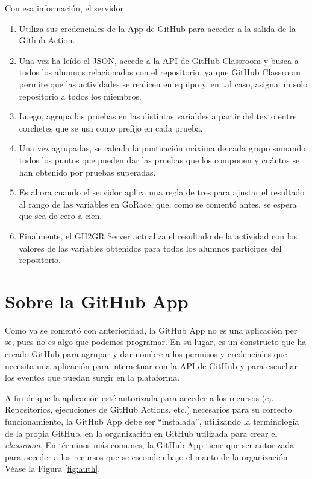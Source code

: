 Con esa información, el servidor 
\begin{enumerate}
\item Utiliza sus credenciales de la App de GitHub para acceder a la salida de la Github Action. 
\item Una vez ha leído el \acrshort{JSON}, accede a la \acrshort{API} de GitHub Classroom y busca a todos los alumnos relacionados con el repositorio, ya que GitHub Classroom permite que las actividades se realicen en equipo y, en tal caso, asigna un solo repositorio a todos los miembros. 
\item Luego, agrupa las pruebas en las distintas variables a partir del texto entre corchetes que se usa como prefijo en cada prueba. 
\item Una vez agrupadas, se calcula la puntuación máxima de cada grupo sumando todos los puntos que pueden dar las pruebas que los componen y cuántos se han obtenido por pruebas superadas. 
\item Es ahora cuando el servidor aplica una regla de tres para ajustar el resultado al rango de las variables en GoRace, que, como se comentó antes, se espera que sea de cero a cien. 
\item Finalmente, el GH2GR Server actualiza el resultado de la actividad con los valores de las variables obtenidos para todos los alumnos partícipes del repositorio.
\end{enumerate}

\section{Sobre la GitHub App}
Como ya se comentó con anterioridad, la GitHub App no es una aplicación per se, pues no es algo que podemos programar. En su lugar, es un constructo que ha creado GitHub para agrupar y dar nombre a los permisos y credenciales que necesita una aplicación para interactuar con la API de GitHub y para escuchar los eventos que puedan surgir en la plataforma.

A fin de que la aplicación esté autorizada para acceder a los recursos (ej. Repositorios, ejecuciones de GitHub Actions, etc.) necesarios para su correcto funcionamiento, la GitHub App debe ser ``instalada'', utilizando la terminología de la propia GitHub, en la organización en GitHub utilizada para crear el \textit{classroom}. En términos más comunes, la GitHub App tiene que ser autorizada para acceder a los recursos que se esconden bajo el manto de la organización. Véase la Figura \ref{fig:auth}.

